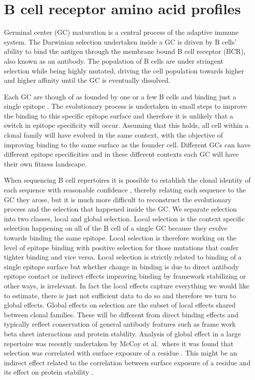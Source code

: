
\iffalse




\chapter{B cell receptor amino acid profiles}

Germinal center (GC) maturation is a central process of the adaptive immune system.
The Darwinian selection undertaken inside a GC is driven by B cells' ability to bind the antigen through the membrane bound B cell receptor (BCR), also known as an antibody.
The population of B cells are under stringent selection while being highly mutated, driving the cell population towards higher and higher affinity until the GC is eventually dissolved.

Each GC are though of as founded by one or a few B cells and binding just a single epitope \cite{tas2016visualizing}.
The evolutionary process is undertaken in small steps to improve the binding to this specific epitope surface and therefore it is unlikely that a switch in epitope specificity will occur.
Assuming that this holds, all cell within a clonal family will have evolved in the same context, with the objective of improving binding to the same surface as the founder cell.
Different GCs can have different epitope specificities and in these different contexts each GC will have their own fitness landscape.

When sequencing B cell repertoires it is possible to establish the clonal identity of each sequence with reasonable confidence \cite{ralph2016likelihood}, thereby relating each sequence to the GC they arose, but it is much more difficult to reconstruct the evolutionary process and the selection that happened inside the GC.
We separate selection into two classes, local and global selection.
Local selection is the context specific selection happening on all of the B cell of a single GC because they evolve towards binding the same epitope.
Local selection is therefore working on the level of epitope binding with positive selection for those mutations that confer tighter binding and vice versa.
Local selection is strictly related to binding of a single epitope surface but whether change in binding is due to direct antibody epitope contact or indirect effects improving binding by framework stabilizing or other ways, is irrelevant.
In fact the local effects capture everything we would like to estimate, there is just not sufficient data to do so and therefore we turn to global effects.
Global effects on selection are the subset of local effects shared between clonal families.
These will be different from direct binding effects and typically reflect conservation of general antibody features such as frame work beta sheet interactions and protein stability.
Analysis of global effect in a large repertoire was recently undertaken by McCoy et al.\ where it was found that selection was correlated with surface exposure of a residue \cite{mccoy2015quantifying}.
This might be an indirect effect related to the correlation between surface exposure of a residue and its effect on protein stability \cite{echave2016causes}.

